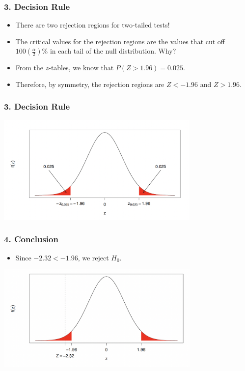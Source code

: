 \documentclass[12pt]{beamer}
\begin{document}
\begin{frame}
	\frametitle{3. Decision Rule}
	
	\begin{itemize}[label={\color{blue}$\blacktriangleright$}]
		\item There are two rejection regions for two-tailed tests!
		
		\item The critical values for the rejection regions are the values that cut off $100 \left(\frac{\alpha}{2}\right) \%$ in each tail of the null distribution. Why?
		
		\item From the $z$-tables, we know that $P(Z > 1.96) = 0.025$.
		
		\item Therefore, by symmetry, the rejection regions are $Z < -1.96$ and $Z > 1.96$.
	\end{itemize}
	
\end{frame}
\begin{frame}
	\frametitle{3. Decision Rule}

	\centering
	\includegraphics[width=10cm]{decision.png}
\end{frame}
\begin{frame}
	\frametitle{4. Conclusion}
	\begin{itemize}[label={\color{blue}$\blacktriangleright$}]
		\item Since $-2.32<-1.96$, we reject $H_0$.
	\end{itemize}
	\centering
	\includegraphics[width=10cm]{conclusion.png}
\end{frame}
\end{document}

